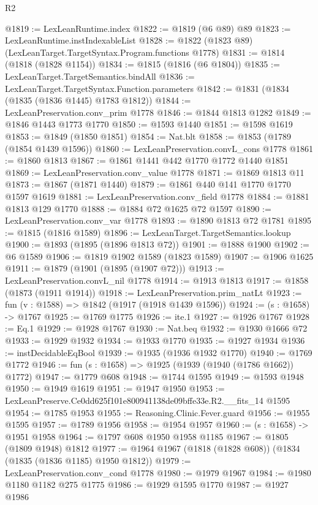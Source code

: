 \begin{lexlean}{R2}
\begin{coremodule}
@1819 := LexLeanRuntime.index
@1822 := @1819 (@6 @89) @89
@1823 := LexLeanRuntime.instIndexableList
@1828 := @1822 (@1823 @89) (LexLeanTarget.TargetSyntax.Program.functions @1778)
@1831 := @1814 (@1818 (@1828 @1154))
@1834 := @1815 (@1816 (@6 @1804))
@1835 := LexLeanTarget.TargetSemantics.bindAll
@1836 := LexLeanTarget.TargetSyntax.Function.parameters
@1842 := @1831 (@1834 (@1835 (@1836 @1445) @1783 @1812))
@1844 := LexLeanPreservation.conv_prim @1778
@1846 := @1844 @1813 @1282
@1849 := @1846 @1443 @1773 @1770
@1850 := @1593 @1440
@1851 := @1598 @1619
@1853 := @1849 (@1850 @1851)
@1854 := Nat.blt
@1858 := @1853 (@1789 (@1854 @1439 @1596))
@1860 := LexLeanPreservation.convL_cons @1778
@1861 := @1860 @1813
@1867 := @1861 @1441 @442 @1770 @1772 @1440 @1851
@1869 := LexLeanPreservation.conv_value @1778
@1871 := @1869 @1813 @11
@1873 := @1867 (@1871 @1440)
@1879 := @1861 @440 @141 @1770 @1770 @1597 @1619
@1881 := LexLeanPreservation.conv_field @1778
@1884 := @1881 @1813 @129 @1770
@1888 := @1884 @72 @1625 @72 @1597
@1890 := LexLeanPreservation.conv_var @1778
@1893 := @1890 @1813 @72 @1781
@1895 := @1815 (@1816 @1589)
@1896 := LexLeanTarget.TargetSemantics.lookup
@1900 := @1893 (@1895 (@1896 @1813 @72))
@1901 := @1888 @1900
@1902 := @6 @1589
@1906 := @1819 @1902 @1589 (@1823 @1589)
@1907 := @1906 @1625
@1911 := @1879 (@1901 (@1895 (@1907 @72)))
@1913 := LexLeanPreservation.convL_nil @1778
@1914 := @1913 @1813
@1917 := @1858 (@1873 (@1911 @1914))
@1918 := LexLeanPreservation.prim_natLt
@1923 := fun (v : @1588) => @1842 (@1917 (@1918 @1439 @1596))
@1924 := (s : @1658) -> @1767
@1925 := @1769 @1775
@1926 := ite.{1}
@1927 := @1926 @1767
@1928 := Eq.{1}
@1929 := @1928 @1767
@1930 := Nat.beq
@1932 := @1930 @1666 @72
@1933 := @1929 @1932
@1934 := @1933 @1770
@1935 := @1927 @1934
@1936 := instDecidableEqBool
@1939 := @1935 (@1936 @1932 @1770)
@1940 := @1769 @1772
@1946 := fun (s : @1658) => @1925 (@1939 (@1940 (@1786 @1662)) @1772)
@1947 := @1779 @608
@1948 := @1744 @1595
@1949 := @1593 @1948
@1950 := @1949 @1619
@1951 := @1947 @1950
@1953 := LexLeanPreserve.Ce0dd625f101e800941138de09bffe33e.R2.__fits_14 @1595
@1954 := @1785 @1953
@1955 := Reasoning.Clinic.Fever.guard
@1956 := @1955 @1595
@1957 := @1789 @1956
@1958 := @1954 @1957
@1960 := (s : @1658) -> @1951 @1958
@1964 := @1797 @608 @1950 @1958 @1185
@1967 := @1805 (@1809 @1948) @1812
@1977 := @1964 @1967 (@1818 (@1828 @608)) (@1834 (@1835 (@1836 @1185) @1950 @1812))
@1979 := LexLeanPreservation.conv_cond @1778
@1980 := @1979 @1967
@1984 := @1980 @1180 @1182 @275 @1775
@1986 := @1929 @1595 @1770
@1987 := @1927 @1986

\end{coremodule}
\end{lexlean}
